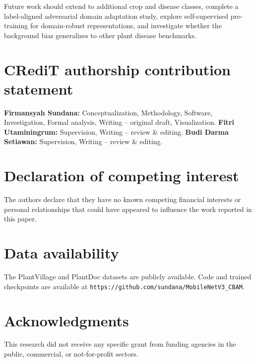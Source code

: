 \documentclass[preprint,12pt]{elsarticle}
\begin{document}
Future work should extend to additional crop and disease classes, complete a label-aligned adversarial domain adaptation study, explore self-supervised pre-training for domain-robust representations, and investigate whether the background bias generalizes to other plant disease benchmarks.

\section*{CRediT authorship contribution statement}
\textbf{Firmansyah Sundana:} Conceptualization, Methodology, Software, Investigation, Formal analysis, Writing -- original draft, Visualization. \textbf{Fitri Utaminingrum:} Supervision, Writing -- review \& editing. \textbf{Budi Darma Setiawan:} Supervision, Writing -- review \& editing.

\section*{Declaration of competing interest}
The authors declare that they have no known competing financial interests or personal relationships that could have appeared to influence the work reported in this paper.

\section*{Data availability}
The PlantVillage and PlantDoc datasets are publicly available. Code and trained checkpoints are available at \texttt{https://github.com/sundana/MobileNetV3\_CBAM}.

\section*{Acknowledgments}
This research did not receive any specific grant from funding agencies in the public, commercial, or not-for-profit sectors.



\end{document}
